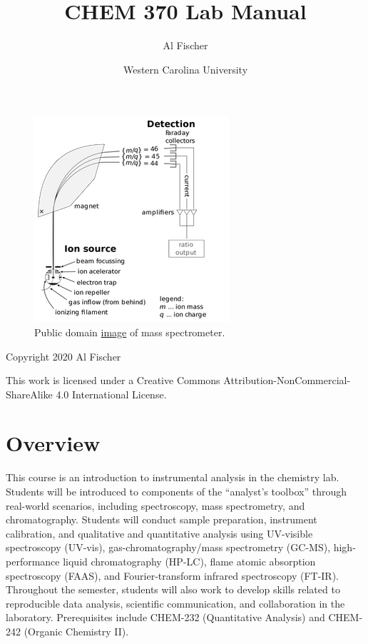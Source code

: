 \documentclass[]{tufte-book}
\title{CHEM 370 Lab Manual}
\author{Al Fischer}
\date{Western Carolina University}
\begin{document}
\maketitle



{
\hypersetup{linkcolor=black}
\setcounter{tocdepth}{1}
\tableofcontents
}

\hypertarget{section}{%
\chapter*{}\label{section}}

\begin{figure}
\centering
\includegraphics{images/cover-image-mass-spec.png}
\caption{Public domain \href{https://commons.wikimedia.org/wiki/File:Mass_Spectrometer_Schematic.svg\#/media/File:Mass_Spectrometer_Schematic.svg}{image} of mass spectrometer.}
\end{figure}

Copyright 2020 Al Fischer

This work is licensed under a Creative Commons Attribution-NonCommercial-ShareAlike 4.0 International License.

\hypertarget{overview}{%
\chapter*{Overview}\label{overview}}

This course is an introduction to instrumental analysis in the chemistry lab. Students will be introduced to components of the ``analyst's toolbox'' through real-world scenarios, including spectroscopy, mass spectrometry, and chromatography. Students will conduct sample preparation, instrument calibration, and qualitative and quantitative analysis using UV-visible spectroscopy (UV-vis), gas-chromatography/mass spectrometry (GC-MS), high-performance liquid chromatography (HP-LC), flame atomic absorption spectroscopy (FAAS), and Fourier-transform infrared spectroscopy (FT-IR). Throughout the semester, students will also work to develop skills related to reproducible data analysis, scientific communication, and collaboration in the laboratory. Prerequisites include CHEM-232 (Quantitative Analysis) and CHEM-242 (Organic Chemistry II).
\end{document}
